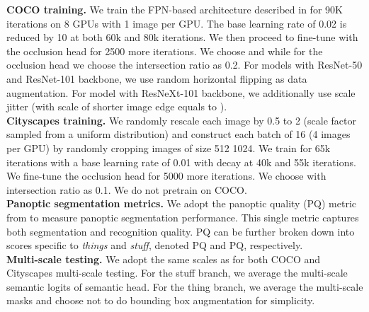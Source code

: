 \documentclass[10pt,twocolumn,letterpaper]{article}
\begin{document}
\noindent \textbf{COCO training.} We train the FPN-based architecture described in \cite{kirillov2019panoptic} for 90K iterations on 8 GPUs with 1 image per GPU. The base learning rate of 0.02 is reduced by 10 at both 60k and 80k iterations. We then proceed to fine-tune with the occlusion head for 2500 more iterations. We choose  and  while for the occlusion head we choose the intersection ratio  as 0.2. For models with ResNet-50 and ResNet-101 backbone, we use random horizontal flipping as data augmentation. For model with ResNeXt-101 backbone, we additionally use scale jitter (with scale of shorter image edge equals to ).\\\noindent \textbf{Cityscapes training.} We randomly rescale each image by 0.5 to 2 (scale factor sampled from a uniform distribution) and construct each batch of 16 (4 images per GPU) by randomly cropping images of size 512  1024. We train for 65k iterations with a base learning rate of 0.01 with decay at 40k and 55k iterations. We fine-tune the occlusion head for 5000 more iterations. We choose  with intersection ratio  as 0.1. We do not pretrain on COCO.\\ 
\noindent \textbf{Panoptic segmentation metrics.} We adopt the panoptic quality (PQ) metric from \cite{kirillov2018panoptic} to measure panoptic segmentation performance. This single metric captures both segmentation and recognition quality. PQ can be further broken down into scores specific to \textit{things} and \textit{stuff}, denoted PQ and PQ, respectively.\\
\noindent \textbf{Multi-scale testing.} We adopt the same scales as \cite{xiong2019upsnet} for both COCO and Cityscapes multi-scale testing. For the stuff branch, we average the multi-scale semantic logits of semantic head. For the thing branch, we average the multi-scale masks and choose not to do bounding box augmentation for simplicity.
\end{document}
